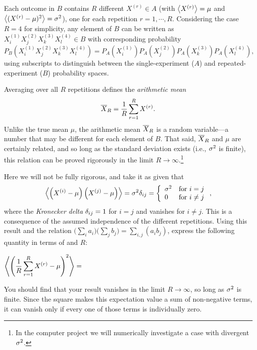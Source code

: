 Each outcome in $B$ contains $R$ different $X^{(r)} \in A$ (with $\left\langle X^{(r)} \right\rangle = \mu$ and $\left\langle (X^{(r)} - \mu)^2 \right\rangle = \sigma^2$), one for each repetition $r = 1, \cdots, R$.
Considering the case $R = 4$ for simplicity, any element of $B$ can be written as $X_i^{(1)} X_j^{(2)} X_k^{(3)} X_l^{(4)} \in B$ with corresponding probability
\begin{equation*}
  P_B\left(X_i^{(1)} X_j^{(2)} X_k^{(3)} X_l^{(4)}\right) = P_A\left(X_i^{(1)}\right) P_A\left(X_j^{(2)}\right) P_A\left(X_k^{(3)}\right) P_A\left(X_l^{(4)}\right),
\end{equation*}
using subscripts to distinguish between the single-experiment ($A$) and repeated-experiment ($B$) probability spaces.

Averaging over all $R$ repetitions defines the \textit{arithmetic mean}
\begin{equation}
  \label{eq:ave}
  \overline X_R = \frac{1}{R} \sum_{r = 1}^R X^{(r)}.
\end{equation}
Unlike the true mean $\mu$, the arithmetic mean $\overline X_R$ is a random variable---a number that may be different for each element of $B$.
That said, $\overline X_R$ and $\mu$ are certainly related, and so long as the standard deviation exists (i.e., $\sigma^2$ is finite), this relation can be proved rigorously in the limit $R \to \infty$.\footnote{In the computer project we will numerically investigate a case with divergent $\sigma^2$.}

Here we will not be fully rigorous, and take it as given that
\begin{equation*}
  \left\langle \left(X^{(i)} - \mu\right)\left(X^{(j)} - \mu\right) \right\rangle = \sigma^2 \delta_{ij} = \left\{\begin{array}{ll}\sigma^2 & \mbox{for } i = j \\ 0 & \mbox{for } i \ne j\end{array}\right.,
\end{equation*}
where the \textit{Kronecker delta} $\delta_{ij} = 1$ for $i = j$ and vanishes for $i \ne j$.
This is a consequence of the assumed independence of the different repetitions.
Using this result and the relation $\big(\sum_i a_i\big)\big(\sum_j b_j\big) = \sum_{i, j} \left(a_i b_j\right)$, express the following quantity in terms of \si and $R$:
\begin{mdframed}
  $\displaystyle \left\langle \left(\frac{1}{R} \sum_{r = 1}^R X^{(r)} - \mu\right)^2 \right\rangle = $ \\[100 pt]
\end{mdframed}
You should find that your result vanishes in the limit $R \to \infty$, so long as $\sigma^2$ is finite.
Since the square makes this expectation value a sum of non-negative terms, it can vanish only if every one of those terms is individually zero.

